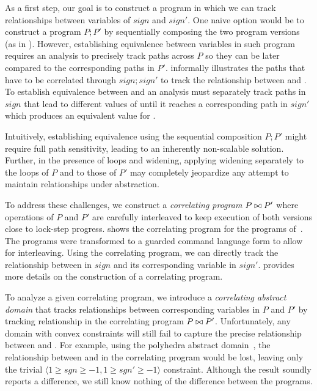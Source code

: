  As a first step, our goal is to construct a program in which we can track relationships between variables of $sign$ and $sign'$. One naive option would be to construct a program $P;P'$ by sequentially composing the two program versions (as in \cite{EnglerRamos11}). However, establishing equivalence between variables in such program requires an analysis to precisely track paths across $P$ so they can be later compared to the corresponding paths in $P'$.  informally illustrates the paths that have to be correlated through $sign;sign'$ to track the relationship between  and . To establish equivalence between  and  an analysis must separately track paths in $sign$ that lead to different values of  until it reaches a corresponding path in $sign'$ which produces an equivalent value for .

Intuitively, establishing equivalence using the sequential composition $P;P'$ might require full path sensitivity, leading to an inherently non-scalable solution. Further, in the presence of loops and widening, applying widening separately to the loops of $P$ and to those of $P'$ may completely jeopardize any attempt to maintain relationships under abstraction.

To address these challenges, we construct a \emph{correlating program} $P \bowtie P'$ where operations of $P$ and $P'$ are carefully interleaved to keep execution of both versions close to lock-step progress.  shows the correlating program for the programs of~. The programs were transformed to a guarded command language form to allow for interleaving. Using the correlating program, we can directly track the relationship between  in $sign$ and its corresponding variable  in $sign'$.  provides more details on the construction of a correlating program.

To analyze a given correlating program, we introduce a \emph{correlating abstract domain} that tracks relationships between corresponding variables in $P$ and $P'$ by tracking relationship in the correlating program $P \bowtie P'$. Unfortunately, any domain with convex constraints will still fail to capture the precise relationship between  and . For example, using the polyhedra abstract domain~\cite{CousotHalbwachs78}, the relationship between  and  in the correlating program would be lost, leaving only the trivial $\langle 1 \geq sgn \geq -1, 1 \geq sgn' \geq -1 \rangle$ constraint. Although the result soundly reports a difference, we still know nothing of the difference between the programs.

